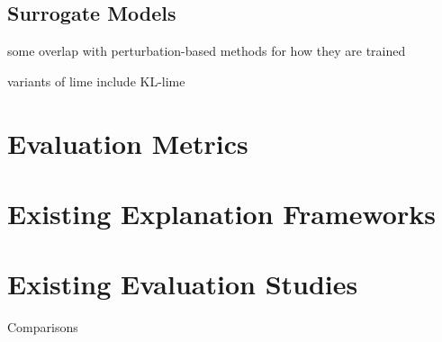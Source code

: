 \documentclass[main]{subfiles}
\begin{document}
\subsection{Surrogate Models}
some overlap with perturbation-based methods for how they are trained



variants of lime include KL-lime

\section{Evaluation Metrics}










\section{Existing Explanation Frameworks}



\section{Existing Evaluation Studies}

Comparisons
\end{document}
